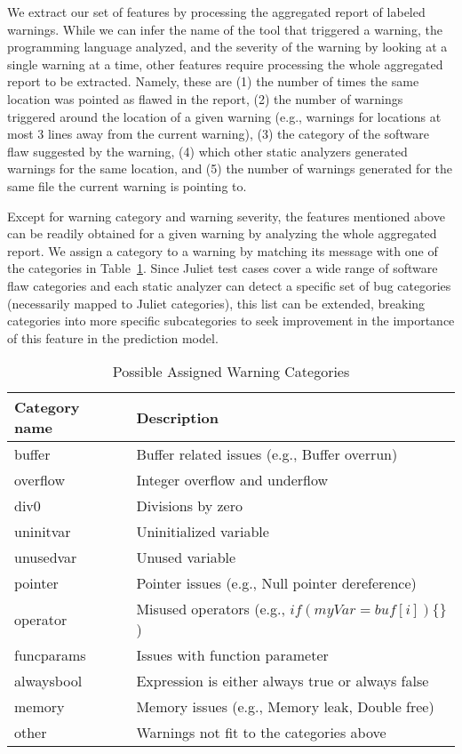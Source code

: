We extract our set of features by processing the aggregated report of labeled
warnings.
While we can infer the name of the tool that triggered a warning, the programming
language analyzed, and the severity of the warning by looking
at a single warning at a time,
other features require processing the whole
aggregated report to be extracted. Namely, these are (1) the number of times the same
location was pointed as flawed in the report, (2) the number of warnings triggered
around the location of a given warning (e.g., warnings for locations at most 3
lines away from the current warning), (3) the category of the software flaw
suggested by the warning, (4) which other static analyzers generated warnings for
the same location, and (5) the number of warnings generated for the same file the
current warning is pointing to.

Except for warning category and warning severity, the features
mentioned above can be readily obtained for a given warning by analyzing the
whole aggregated report. We assign a category to a warning by matching its
message with one of the categories in Table~\ref{tab:warning_categories}. Since
Juliet test cases cover a wide range of software flaw categories and each
static analyzer can detect a specific set of bug categories (necessarily mapped
to Juliet categories), this list can be extended, breaking categories into more
specific subcategories to seek improvement in the importance of this feature in
the prediction model.

\begin{table}
  \begin{center}
      \begin{tabular}{ll}\hline
        Category name & Description \\
      \hline
        buffer &  Buffer related issues (e.g., Buffer overrun) \\
        overflow & Integer overflow and underflow \\
        div0 & Divisions by zero \\
        uninitvar & Uninitialized variable \\
        unusedvar & Unused variable \\
        pointer & Pointer issues (e.g., Null pointer dereference) \\
        operator & Misused operators (e.g., $if(myVar = buf[i])\{\}$) \\
        funcparams & Issues with function parameter \\
        alwaysbool & Expression is either always true or always false \\
        memory & Memory issues (e.g., Memory leak, Double free)\\
        other & Warnings not fit to the categories above \\ \hline
      \end{tabular}
      \caption{Possible Assigned Warning Categories}\label{tab:warning_categories}
  \end{center}
\end{table}

